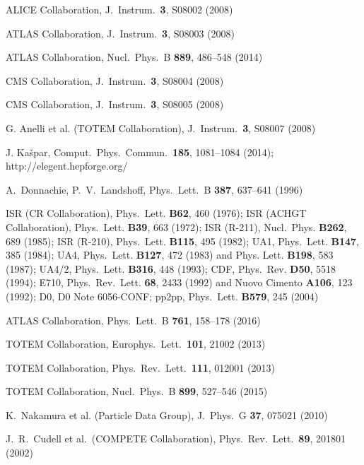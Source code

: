 \documentclass{webofc}
\def\Name#1{#1}
\def\REVIEW#1#2#3#4{#1 \textbf{#2}, #4 (#3)}
\begin{document}
\begin{thebibliography}{99}

	ALICE Collaboration, J.~Instrum.~\textbf{3}, S08002 (2008)

	ATLAS Collaboration, J.~Instrum.~\textbf{3}, S08003 (2008)

	ATLAS Collaboration, Nucl.~Phys.~B \textbf{889}, 486--548 (2014)

	CMS Collaboration, J.~Instrum.~\textbf{3}, S08004 (2008)

	CMS Collaboration, J.~Instrum.~\textbf{3}, S08005 (2008)

	G. Anelli et al. (TOTEM Collaboration), J.~Instrum.~\textbf{3}, S08007 (2008)

	J. Kašpar, Comput.~Phys.~Commun.~\textbf{185}, 1081--1084 (2014); http://elegent.hepforge.org/

	A.~Donnachie, P.~V.~Landshoff, Phys.~Lett.~B \textbf{387}, 637--641 (1996)

	\Name{ISR (CR Collaboration)}, \REVIEW{Phys.~Lett.}{B62}{1976}{460}; 
	\Name{ISR (ACHGT Collaboration)}, \REVIEW{Phys.~Lett.}{B39}{1972}{663}; 
	\Name{ISR (R-211)}, \REVIEW{Nucl.~Phys.}{B262}{1985}{689}; 
	\Name{ISR (R-210)}, \REVIEW{Phys.~Lett.}{B115}{1982}{495}; 
	\Name{UA1}, \REVIEW{Phys.~Lett.}{B147}{1984}{385}; 
	\Name{UA4}, \REVIEW{Phys.~Lett.}{B127}{1983}{472} and \REVIEW{Phys. Lett.}{B198}{1987}{583}; 
	\Name{UA4/2}, \REVIEW{Phys.~Lett.}{B316}{1993}{448}; 
	\Name{CDF}, \REVIEW{Phys.~Rev.}{D50}{1994}{5518}; 
	\Name{E710}, \REVIEW{Phys.~Rev.~Lett.}{68}{1992}{2433} and \REVIEW{Nuovo Cimento}{A106}{1992}{123}; 
	\Name{D0}, D0 Note 6056-CONF; 
	\Name{pp2pp}, \REVIEW{Phys.~Lett.}{B579}{2004}{245}

	ATLAS Collaboration, Phys.~Lett.~B \textbf{761}, 158--178 (2016)

	TOTEM Collaboration, Europhys.~Lett.~\textbf{101}, 21002 (2013)

	TOTEM Collaboration, Phys.~Rev.~Lett.~\textbf{111}, 012001 (2013)

	TOTEM Collaboration, Nucl.~Phys.~B \textbf{899}, 527--546 (2015)

	K.~Nakamura et al. (Particle Data Group), J.~Phys.~G \textbf{37}, 075021 (2010)

	J.~R.~Cudell et al.~(COMPETE Collaboration), Phys.~Rev.~Lett.~\textbf{89}, 201801 (2002)


\end{thebibliography}
\end{document}
